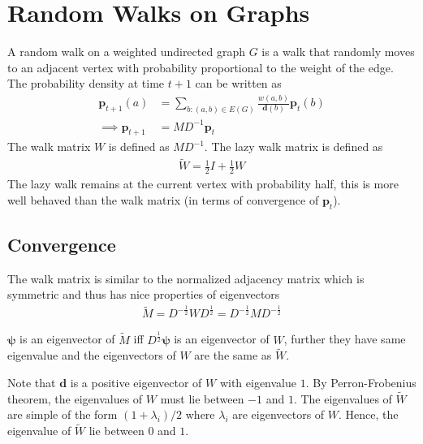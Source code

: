 \documentclass{math}
\renewcommand{\vec}[1]{\boldsymbol{#1}}
\begin{document}
\section{Random Walks on Graphs}

A random walk on a weighted undirected graph $G$ is a walk that randomly moves to an adjacent vertex with probability proportional
to the weight of the edge. The probability density at time $t + 1$ can be written as
\begin{align*}
    \vec{p}_{t + 1}(a) &= \sum_{b: (a, b) \in E(G)} \frac{w(a, b)}{\vec{d}(b)} \vec{p}_t(b) \\
    \implies \vec{p}_{t + 1} &= M D^{-1} \vec{p}_t
\end{align*}
The walk matrix $W$ is defined as $MD^{-1}$. The lazy walk matrix is defined as
\begin{align*}
    \widetilde{W} = \frac{1}{2} I + \frac{1}{2} W
\end{align*}
The lazy walk remains at the current vertex with probability half, this is more well behaved than the walk matrix
(in terms of convergence of $\vec{p}_t$).

\subsection{Convergence}

The walk matrix is similar to the normalized adjacency matrix which is symmetric and thus has nice properties of eigenvectors
\begin{align*}
    \widetilde{M} = D^{-\frac{1}{2}} W D^{\frac{1}{2}} = D^{-\frac{1}{2}} M D^{-\frac{1}{2}}
\end{align*}

\begin{lemma}
    $\vec{\psi}$ is an eigenvector of $\widetilde{M}$ iff $D^{\frac{1}{2}}\vec{\psi}$ is an eigenvector of $W$, further they have same eigenvalue
    and the eigenvectors of $W$ are the same as $\widetilde{W}$.
\end{lemma}

Note that $\vec{d}$ is a positive eigenvector of $W$ with eigenvalue $1$.
By Perron-Frobenius theorem, the eigenvalues of $W$ must lie between $-1$ and $1$.
The eigenvalues of $\widetilde{W}$ are simple of the form $(1 + \lambda_i)/2$ where $\lambda_i$ are eigenvectors of $W$.
Hence, the eigenvalue of $\widetilde{W}$ lie between $0$ and $1$.
\end{document}
